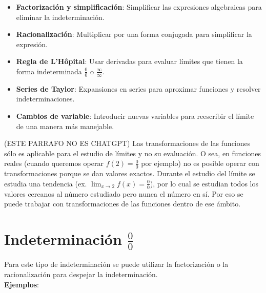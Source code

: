 \documentclass[12pt, a4paper]{article}
\begin{document}
\begin{itemize}
    \item \textbf{Factorización y simplificación}: Simplificar las expresiones algebraicas para eliminar la indeterminación.
    \item \textbf{Racionalización}: Multiplicar por una forma conjugada para simplificar la expresión.
    \item \textbf{Regla de L'Hôpital}: Usar derivadas para evaluar límites que tienen la forma indeterminada $\displaystyle \frac{0}{0} $ o $\displaystyle \frac{\infty}{\infty}$.
    \item \textbf{Series de Taylor}: Expansiones en series para aproximar funciones y resolver indeterminaciones.
    \item \textbf{Cambios de variable}: Introducir nuevas variables para reescribir el límite de una manera más manejable.
\end{itemize}

(ESTE PARRAFO NO ES CHATGPT)
Las transformaciones de las funciones sólo es aplicable para el estudio de límites y no su evaluación. O sea, en funciones reales (cuando queremos operar $f(2)=\frac{0}{0}$ por ejemplo) no es posible operar con transformaciones porque se dan valores exactos. Durante el estudio del límite se estudia una tendencia (ex. $\lim_{x\to2}f(x)=\frac{0}{0}$), por lo cual se estudian todos los valores cercanos al número estudiado pero nunca el número en sí. Por eso se puede trabajar con transformaciones de las funciones dentro de ese ámbito. 

\section{Indeterminación $\displaystyle \frac{0}{0}$}
Para este tipo de indeterminación se puede utilizar la factorización o la racionalización para despejar la indeterminación.\\[6pt]
\textbf{Ejemplos}:
\end{document}
